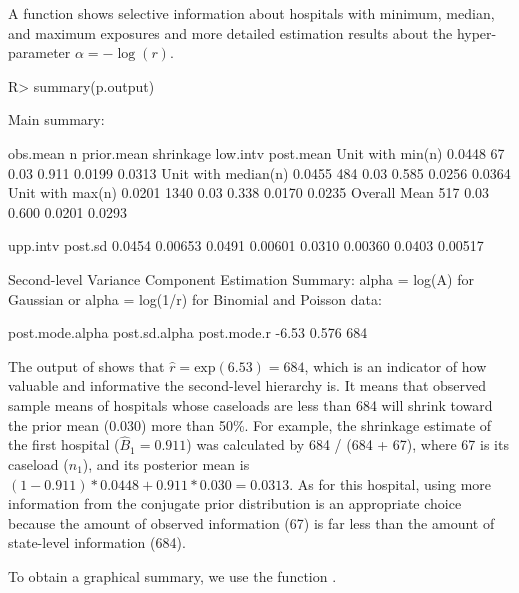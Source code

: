 \documentclass[article]{jss}
\begin{document}
A function  shows selective information about hospitals with minimum, median, and maximum exposures and more detailed estimation results about the hyper-parameter $\alpha=-\log(r)$.  \begin{CodeChunk}
\begin{CodeInput}
R> summary(p.output)
\end{CodeInput}
\begin{CodeOutput}
Main summary:

                    obs.mean    n prior.mean shrinkage low.intv post.mean
Unit with min(n)      0.0448   67       0.03     0.911   0.0199    0.0313   
Unit with median(n)   0.0455  484       0.03     0.585   0.0256    0.0364   
Unit with max(n)      0.0201 1340       0.03     0.338   0.0170    0.0235   
Overall Mean                  517       0.03     0.600   0.0201    0.0293   

                    upp.intv  post.sd
                      0.0454  0.00653
                      0.0491  0.00601
                      0.0310  0.00360
                      0.0403  0.00517

Second-level Variance Component Estimation Summary:
alpha = log(A) for Gaussian or alpha = log(1/r) for Binomial and Poisson data:

post.mode.alpha post.sd.alpha post.mode.r
          -6.53         0.576         684
\end{CodeOutput}
\end{CodeChunk}
The output of  shows that $\hat{r}=\textrm{exp}(6.53)=684$, which is an indicator of how valuable and informative the second-level hierarchy is. It means that observed sample means of hospitals whose caseloads are less than 684 will shrink toward the prior mean (0.030) more than 50\%. For example, the shrinkage estimate of the first hospital ($\hat{B}_{1}= 0.911$) was calculated by 684 / (684 + 67), where 67 is its caseload ($n_{1}$), and its posterior mean is $(1-0.911)*0.0448 + 0.911 * 0.030=0.0313$. As for this hospital, using more information from the conjugate prior distribution is an appropriate choice because the amount  of observed information (67) is far less than the amount of state-level information (684).


To obtain a graphical summary, we use the function .%
\end{document}
